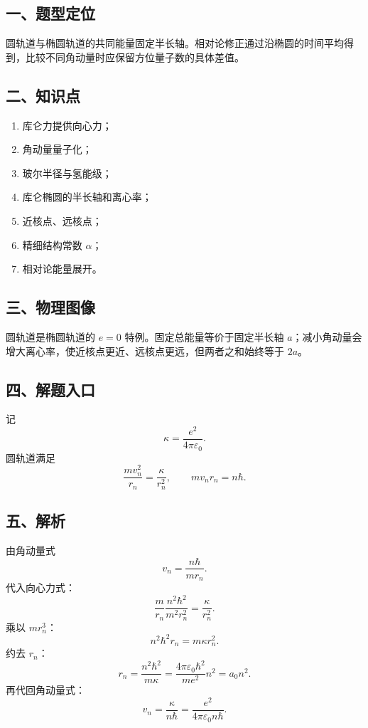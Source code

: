 \documentclass[12pt,a4paper,UTF8]{ctexart}
\newcommand{\tightlist}{\setlength{\itemsep}{0pt}\setlength{\parskip}{0pt}}
\begin{document}
\subsection{一、题型定位}\label{ux4e00ux9898ux578bux5b9aux4f4d-7}

圆轨道与椭圆轨道的共同能量固定半长轴。相对论修正通过沿椭圆的时间平均得到，比较不同角动量时应保留方位量子数的具体差值。

\subsection{二、知识点}\label{ux4e8cux77e5ux8bc6ux70b9-7}

\begin{enumerate}
\def\labelenumi{\arabic{enumi}.}
\tightlist
\item
  库仑力提供向心力；
\item
  角动量量子化；
\item
  玻尔半径与氢能级；
\item
  库仑椭圆的半长轴和离心率；
\item
  近核点、远核点；
\item
  精细结构常数 \(\alpha\)；
\item
  相对论能量展开。
\end{enumerate}

\subsection{三、物理图像}\label{ux4e09ux7269ux7406ux56feux50cf-7}

圆轨道是椭圆轨道的 \(e=0\) 特例。固定总能量等价于固定半长轴
\(a\)；减小角动量会增大离心率，使近核点更近、远核点更远，但两者之和始终等于
\(2a\)。

\subsection{四、解题入口}\label{ux56dbux89e3ux9898ux5165ux53e3-7}

记 \[
\kappa=\frac{e^2}{4\pi\varepsilon_0}.
\] 圆轨道满足 \[
\frac{mv_n^2}{r_n}=\frac{\kappa}{r_n^2},
\qquad
mv_nr_n=n\hbar. \tag{1}
\]

\subsection{五、解析}\label{ux4e94ux89e3ux6790-7}

由角动量式 \[
v_n=\frac{n\hbar}{mr_n}.
\] 代入向心力式： \[
\frac{m}{r_n}
\frac{n^2\hbar^2}{m^2r_n^2}
=\frac{\kappa}{r_n^2}.
\] 乘以 \(mr_n^3\)： \[
n^2\hbar^2r_n=m\kappa r_n^2.
\] 约去 \(r_n\)： \[
\boxed{
r_n=\frac{n^2\hbar^2}{m\kappa}
=\frac{4\pi\varepsilon_0\hbar^2}{me^2}n^2
=a_0n^2
}. \tag{2}
\] 再代回角动量式： \[
\boxed{
v_n=\frac{\kappa}{n\hbar}
=\frac{e^2}{4\pi\varepsilon_0n\hbar}
}. \tag{3}
\]
\end{document}
